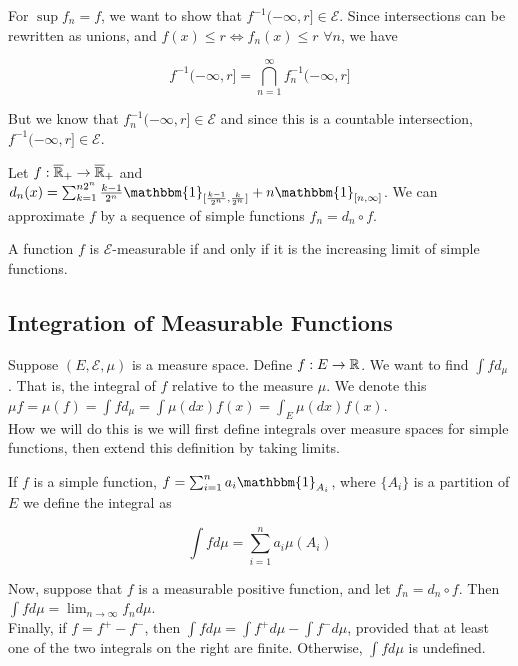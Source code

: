 \documentclass[12pt, titlepage]{article}
\begin{document}
\begin{prf}[]{}
	For $\sup f_n = f$, we want to show that $f^{-1}(-\infty, r] \in \mathcal{E}$. Since intersections can be rewritten as unions, and $f(x) \leq r \iff f_n(x) \leq r$ $\forall n$, we have
	
	\[f^{-1}(-\infty, r] = \bigcap^\infty_{n=1} f^{-1}_n(-\infty, r]\]
	
	But we know that $f^{-1}_n(-\infty, r] \in \mathcal{E}$ and since this is a countable intersection, $f^{-1}(-\infty, r] \in \mathcal{E}$.
\end{prf}

Let $f: \overline{\mathbb{R}}_+ \to \overline{\mathbb{R}}_+$ and $d_n(x) = \sum_{k = 1}^{n2^n} \frac{k-1}{2^n} \mathbbm{1}_{[\frac{k-1}{2^n}, \frac{k}{2^n}]} + n \mathbbm{1}_{[n, \infty]}$. We can approximate $f$ by a sequence of simple functions $f_n = d_n \circ f$.\\

\begin{theo}[]{}
	A function $f$ is $\mathcal{E}$-measurable if and only if it is the increasing limit of simple functions.\\
\end{theo}

\subsection{Integration of Measurable Functions}

Suppose $(E, \mathcal{E}, \mu)$ is a measure space. Define $f: E \to \mathbb{R}$. We want to find $\int f d_\mu$. That is, the integral of $f$ relative to the measure $\mu$. We denote this $\mu f = \mu(f) = \int f d_\mu = \int \mu(dx)f(x) = \int_E \mu(dx) f(x)$.\\

How we will do this is we will first define integrals over measure spaces for simple functions, then extend this definition by taking limits.\\

\begin{dfn}{}
	If $f$ is a simple function, $f = \sum_{i = 1}^n a_i \mathbbm{1}_{A_i}$, where $\{A_i\}$ is a partition of $E$ we define the integral as
	
	\[\int f d\mu = \sum_{i=1}^n a_i \mu(A_i)\]
	
	Now, suppose that $f$ is a measurable positive function, and let $f_n = d_n \circ f$. Then $\int f d\mu = \lim_{n \to \infty} f_n d\mu$.\\
	
	Finally, if $f = f^+ - f^-$, then $\int f d\mu = \int f^+ d\mu - \int f^- d\mu$, provided that at least one of the two integrals on the right are finite. Otherwise, $\int f d\mu$ is undefined.
\end{dfn}
\end{document}
